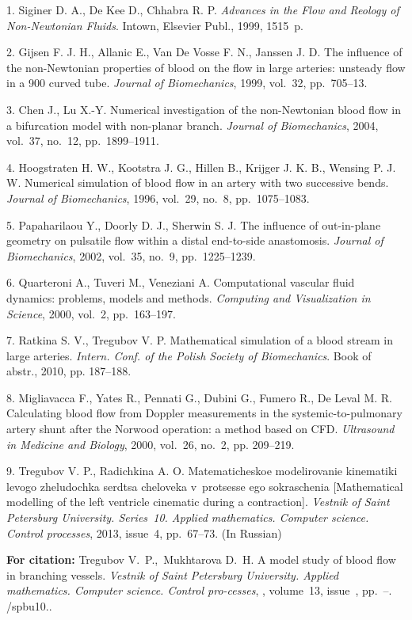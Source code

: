 

{\footnotesize

\vskip 2mm


\vskip 1.5mm




1. Siginer D. A., De Kee D., Chhabra R. P. {\it Advances in the
Flow and Reology of Non-Newtonian Fluids}. Intown, Elsevier Publ.,
1999, 1515~p.


2. Gijsen F. J. H., Allanic E., Van De Vosse F. N., Janssen J. D.
The influence of the non-Newtonian properties of blood on the flow
in large arteries: unsteady flow in a 900 curved tube. {\it
Journal of Biomechanics}, 1999, vol.~32, pp.~705--13.


3. Chen J., Lu X.-Y. Numerical investigation of the non-Newtonian
blood flow in a bifurcation model with non-planar branch. {\it
Journal of  Biomechanics},  2004, vol.~37, no.~12, pp.~1899--1911.


4. Hoogstraten H. W., Kootstra J. G., Hillen B., Krijger J. K. B.,
Wensing P. J. W. Numerical simulation of blood flow in an artery
with two successive bends. {\it Journal of  Biomechanics}, 1996,
vol.~29, no.~8, pp.~1075--1083.


5. Papaharilaou Y., Doorly D. J., Sherwin S. J. The influence of
out-in-plane geometry on pulsatile flow within a distal
end-to-side anastomosis. {\it Journal of  Biomechanics},  2002,
vol.~35, no.~9, pp.~1225--1239.


6. Quarteroni A., Tuveri M., Veneziani A. Computational vascular
fluid dynamics: problems, models and methods. {\it Computing and
Visualization in Science}, 2000, vol.~2, pp.~163--197.


7. Ratkina S. V., Tregubov V. P. Mathematical simulation of a
blood stream in large arteries. {\it Intern. Conf. of the Polish
Society of Biomechanics}. Book of abstr., 2010, pp. 187--188.


8. Migliavacca F., Yates R., Pennati G., Dubini G., Fumero R., De
Leval M. R. Calculating blood flow from Doppler measurements in
the systemic-to-pulmonary artery shunt after the Norwood
operation: a method based on CFD.  {\it Ultrasound in Medicine and
Biology}, 2000, vol.~26, no.~2, pp. 209--219.


9. Tregubov V. P., Radichkina A. O. Matematicheskoe modelirovanie
kinematiki levogo zheludochka serdtsa cheloveka v~protsesse ego
sokraschenia  [Mathematical modelling of the left ventricle
cinematic during a contraction]. {\it Vestnik of Saint Petersburg
University. Series~10. Applied mathematics. Computer science.
Control processes}, 2013, issue~4, pp.~67--73. (In Russian)





\vskip 2mm

{\bf For citation:} Tregubov V.~P.,~Mukhtarova D.~H. A model study
of blood flow in branching vessels. {\it Vestnik of Saint
Petersburg University. Applied mathematics. Computer science.
Control pro-\linebreak cesses}, \issueyear, volume~13,
issue~\issuenum, pp.~\pageref{p4}--\pageref{p4e}.
\doivyp/spbu10.\issueyear.



}
